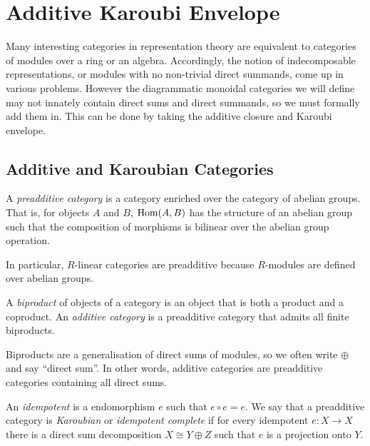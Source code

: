 \section{Additive Karoubi Envelope}
\label{sec:additive-karoubi}

Many interesting categories in representation theory are equivalent to categories of modules over a ring or an algebra. Accordingly, the notion of indecomposable representations, or modules with no non-trivial direct summands, come up in various problems. However the diagrammatic monoidal categories we will define may not innately contain direct sums and direct summands, so we must formally add them in. This can be done by taking the additive closure and Karoubi envelope.

\subsection*{Additive and Karoubian Categories}

\begin{definition}
    A \textit{preadditive category} is a category enriched over the category of abelian groups. That is, for objects $A$ and $B$, $\operatorname{Hom}(A,B)$ has the structure of an abelian group such that the composition of morphisms is bilinear over the abelian group operation.
\end{definition}

In particular, $R$-linear categories are preadditive because $R$-modules are defined over abelian groups.

\begin{definition}
    A \textit{biproduct} of objects of a category is an object that is both a product and a coproduct.
    An \textit{additive category} is a preadditive category that admits all finite biproducts.
\end{definition}

Biproducts are a generalisation of direct sums of modules, so we often write $\oplus$ and say ``direct sum''. In other words, additive categories are preadditive categories containing all direct sums.

\begin{definition}
    An \textit{idempotent} is a endomorphism $e$ such that $e \circ e = e$.
    We say that a preadditive category is \textit{Karoubian} or \textit{idempotent complete} if for every idempotent $e: X \to X$ there is a direct sum decomposition $X \cong Y \oplus Z$ such that $e$ is a projection onto $Y$.
\end{definition}

